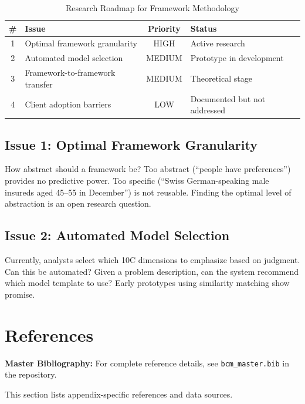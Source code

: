 \begin{table}[htbp]
\centering
\caption{Research Roadmap for Framework Methodology}
\label{tab:fm-roadmap}
\renewcommand{\arraystretch}{1.3}
\begin{tabular}{@{}clcl@{}}
\toprule
\textbf{\#} & \textbf{Issue} & \textbf{Priority} & \textbf{Status} \\
\midrule
1 & Optimal framework granularity & HIGH & Active research \\
2 & Automated model selection & MEDIUM & Prototype in development \\
3 & Framework-to-framework transfer & MEDIUM & Theoretical stage \\
4 & Client adoption barriers & LOW & Documented but not addressed \\
\bottomrule
\end{tabular}
\end{table}

\subsection{Issue 1: Optimal Framework Granularity}

How abstract should a framework be? Too abstract (``people have preferences'') provides no predictive power. Too specific (``Swiss German-speaking male insureds aged 45--55 in December'') is not reusable. Finding the optimal level of abstraction is an open research question.

\subsection{Issue 2: Automated Model Selection}

Currently, analysts select which 10C dimensions to emphasize based on judgment. Can this be automated? Given a problem description, can the system recommend which model template to use? Early prototypes using similarity matching show promise.


\section{References}
\label{sec:fm-references}

\begin{tcolorbox}[colback=blue!5!white, colframe=blue!75!black]
\textbf{Master Bibliography:} For complete reference details, see
\texttt{bcm\_master.bib} in the repository.

This section lists appendix-specific references and data sources.
\end{tcolorbox}

